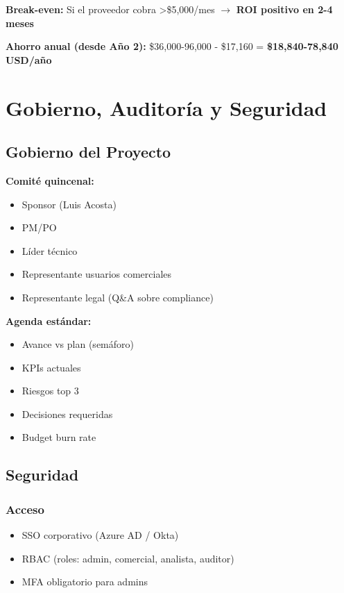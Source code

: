 \documentclass[12pt,a4paper]{article}
\begin{document}
\textbf{Break-even:} Si el proveedor cobra >\$5,000/mes $\rightarrow$ \textcolor{successgreen}{\textbf{ROI positivo en 2-4 meses}}

\textbf{Ahorro anual (desde Año 2):} \$36,000-96,000 - \$17,160 = \textcolor{successgreen}{\textbf{\$18,840-78,840 USD/año}}

\section{Gobierno, Auditoría y Seguridad}

\subsection{Gobierno del Proyecto}

\textbf{Comité quincenal:}
\begin{itemize}[leftmargin=*]
    \item Sponsor (Luis Acosta)
    \item PM/PO
    \item Líder técnico
    \item Representante usuarios comerciales
    \item Representante legal (Q\&A sobre compliance)
\end{itemize}

\textbf{Agenda estándar:}
\begin{itemize}[leftmargin=*]
    \item Avance vs plan (semáforo)
    \item KPIs actuales
    \item Riesgos top 3
    \item Decisiones requeridas
    \item Budget burn rate
\end{itemize}

\subsection{Seguridad}

\subsubsection*{Acceso}
\begin{itemize}[leftmargin=*]
    \item SSO corporativo (Azure AD / Okta)
    \item RBAC (roles: admin, comercial, analista, auditor)
    \item MFA obligatorio para admins
\end{itemize}
\end{document}

